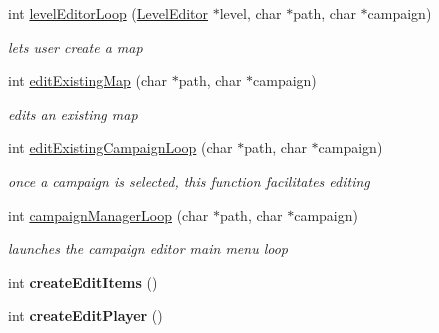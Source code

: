 \begin{DoxyCompactItemize}
\hypertarget{class_game_loops_acda39f058e280040296d03f306fbb5f8}{}\label{class_game_loops_acda39f058e280040296d03f306fbb5f8} 
int \hyperlink{class_game_loops_acda39f058e280040296d03f306fbb5f8}{level\+Editor\+Loop} (\hyperlink{class_level_editor}{Level\+Editor} $\ast$level, char $\ast$path, char $\ast$campaign)
\begin{DoxyCompactList}\small\item\em lets user create a map \end{DoxyCompactList}\item 
\hypertarget{class_game_loops_a2874d34df0e78bb7b2ed1ffb95c0858e}{}\label{class_game_loops_a2874d34df0e78bb7b2ed1ffb95c0858e} 
int \hyperlink{class_game_loops_a2874d34df0e78bb7b2ed1ffb95c0858e}{edit\+Existing\+Map} (char $\ast$path, char $\ast$campaign)
\begin{DoxyCompactList}\small\item\em edits an existing map \end{DoxyCompactList}\item 
\hypertarget{class_game_loops_a4b51acac6c216a920ae948bf5d60e303}{}\label{class_game_loops_a4b51acac6c216a920ae948bf5d60e303} 
int \hyperlink{class_game_loops_a4b51acac6c216a920ae948bf5d60e303}{edit\+Existing\+Campaign\+Loop} (char $\ast$path, char $\ast$campaign)
\begin{DoxyCompactList}\small\item\em once a campaign is selected, this function facilitates editing \end{DoxyCompactList}\item 
\hypertarget{class_game_loops_a653666df83695774b11c7ee483a5944b}{}\label{class_game_loops_a653666df83695774b11c7ee483a5944b} 
int \hyperlink{class_game_loops_a653666df83695774b11c7ee483a5944b}{campaign\+Manager\+Loop} (char $\ast$path, char $\ast$campaign)
\begin{DoxyCompactList}\small\item\em launches the campaign editor main menu loop \end{DoxyCompactList}\item 
\hypertarget{class_game_loops_a89a697c5e7d1542c788c6e66c9699494}{}\label{class_game_loops_a89a697c5e7d1542c788c6e66c9699494} 
int {\bfseries create\+Edit\+Items} ()
\item 
\hypertarget{class_game_loops_a94b59a3e91685adfec0c1963e67b2348}{}\label{class_game_loops_a94b59a3e91685adfec0c1963e67b2348} 
int {\bfseries create\+Edit\+Player} ()
\end{DoxyCompactItemize}



